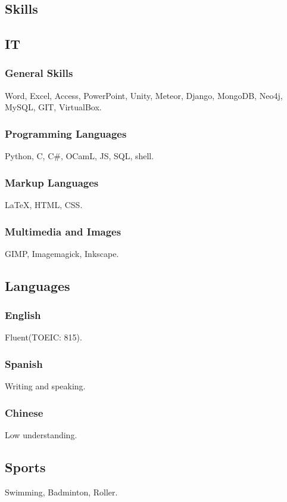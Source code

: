 \documentclass{article}
\begin{document}
\begin{multicols}{2}
        \columnbreak

        \section{Skills}
            \subsection{IT}
                \subsubsection{General Skills}
                    Word, Excel, Access, PowerPoint, Unity, Meteor, Django,  MongoDB, Neo4j, MySQL, GIT, VirtualBox.
                \subsubsection{Programming Languages}
                    Python, C, C\#, OCamL, JS, SQL, shell.
                \subsubsection{Markup Languages}
                    {\LaTeX}, HTML, CSS.
                \subsubsection{Multimedia and Images}
                    GIMP, Imagemagick, Inkscape.
            \subsection{Languages}
                \subsubsection{English}
                    Fluent(TOEIC: 815).
                \subsubsection{Spanish}
                    Writing and speaking.
                \subsubsection{Chinese}
                    Low understanding.
                \subsection{Sports}
                    Swimming, Badminton, Roller.
    \end{multicols}
\end{document}
